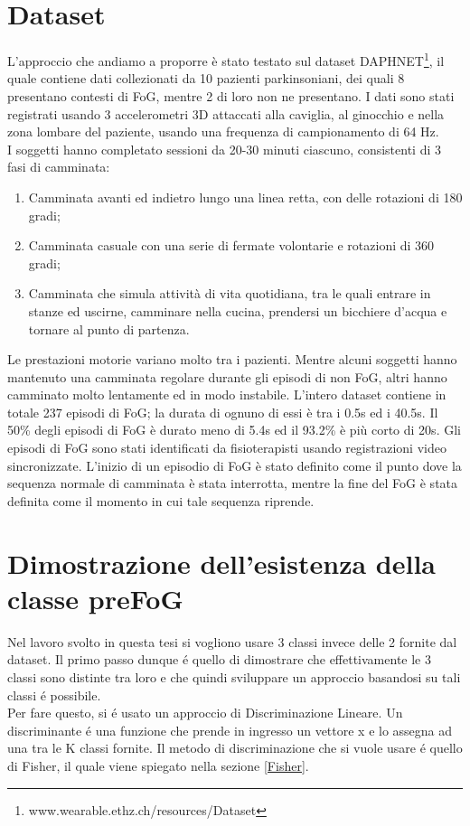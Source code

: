 \section{Dataset}
L'approccio che andiamo a proporre è stato testato sul dataset DAPHNET\footnote{www.wearable.ethz.ch/resources/Dataset}, il quale contiene dati collezionati da 10 pazienti parkinsoniani, dei quali 8 presentano contesti di FoG, mentre 2 di loro non ne presentano. I dati sono stati registrati usando 3 accelerometri 3D attaccati alla caviglia, al ginocchio e nella zona lombare del paziente, usando una frequenza di campionamento di 64 Hz.\\
I soggetti hanno completato sessioni da 20-30 minuti ciascuno, consistenti di 3 fasi di camminata:
\begin{enumerate}
	\item Camminata avanti ed indietro lungo una linea retta, con delle rotazioni di 180 gradi;
	\item Camminata casuale con una serie di fermate volontarie e rotazioni di 360 gradi;
	\item Camminata che simula attività di vita quotidiana, tra le quali entrare in stanze ed uscirne, camminare nella cucina, prendersi un bicchiere d'acqua e tornare al punto di partenza.
\end{enumerate}
Le prestazioni motorie variano molto tra i pazienti. Mentre alcuni soggetti hanno mantenuto una camminata regolare durante gli episodi di non FoG, altri hanno camminato molto lentamente ed in modo instabile. L'intero dataset contiene in totale 237 episodi di FoG; la durata di ognuno di essi è tra i 0.5s ed i 40.5s. Il 50\% degli episodi di FoG è durato meno di 5.4s ed il 93.2\% è più corto di 20s. Gli episodi di FoG sono stati identificati da fisioterapisti usando registrazioni video sincronizzate. L'inizio di un episodio di FoG è stato definito come il punto dove la sequenza normale di camminata è stata interrotta, mentre la fine del FoG è stata definita come il momento in cui tale sequenza riprende.

\section{Dimostrazione dell'esistenza della classe preFoG}
Nel lavoro svolto in questa tesi si vogliono usare 3 classi invece delle 2 fornite dal dataset. Il primo passo dunque é quello di dimostrare che effettivamente le 3 classi sono distinte tra loro e che quindi sviluppare un approccio basandosi su tali classi é possibile.\\
Per fare questo, si é usato un approccio di Discriminazione Lineare. Un discriminante é una funzione che prende in ingresso un vettore x e lo assegna ad una tra le K classi fornite. Il metodo di discriminazione che si vuole usare é quello di Fisher, il quale viene spiegato nella sezione \ref{Fisher}.\\
